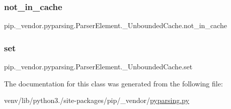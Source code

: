 \subsubsection{\texorpdfstring{not\+\_\+in\+\_\+cache}{not\_in\_cache}}
{\footnotesize\ttfamily pip.\+\_\+vendor.\+pyparsing.\+Parser\+Element.\+\_\+\+Unbounded\+Cache.\+not\+\_\+in\+\_\+cache}

\mbox{\label{classpip_1_1__vendor_1_1pyparsing_1_1ParserElement_1_1__UnboundedCache_abe8bacd816113253c167417ce8fc8413}} 
\subsubsection{\texorpdfstring{set}{set}}
{\footnotesize\ttfamily pip.\+\_\+vendor.\+pyparsing.\+Parser\+Element.\+\_\+\+Unbounded\+Cache.\+set}



The documentation for this class was generated from the following file\+:\begin{DoxyCompactItemize}
\item 
venv/lib/python3./site-\/packages/pip/\+\_\+vendor/\hyperlink{pip_2__vendor_2pyparsing_8py}{pyparsing.\+py}\end{DoxyCompactItemize}
